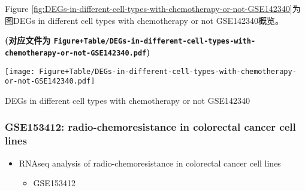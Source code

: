 \documentclass[
]{article}
\providecommand{\tightlist}{%
  \setlength{\itemsep}{0pt}\setlength{\parskip}{0pt}}
\begin{document}
Figure \ref{fig:DEGs-in-different-cell-types-with-chemotherapy-or-not-GSE142340}为图DEGs in different cell types with chemotherapy or not GSE142340概览。

\textbf{(对应文件为 \texttt{Figure+Table/DEGs-in-different-cell-types-with-chemotherapy-or-not-GSE142340.pdf})}

\def\@captype{figure}
\begin{center}
\texttt{[image: Figure+Table/DEGs-in-different-cell-types-with-chemotherapy-or-not-GSE142340.pdf]}
\caption{DEGs in different cell types with chemotherapy or not GSE142340}\label{fig:DEGs-in-different-cell-types-with-chemotherapy-or-not-GSE142340}
\end{center}

\hypertarget{gse153412-radio-chemoresistance-in-colorectal-cancer-cell-lines}{%
\subsubsection{GSE153412: radio-chemoresistance in colorectal cancer cell lines}\label{gse153412-radio-chemoresistance-in-colorectal-cancer-cell-lines}}

\begin{itemize}
\tightlist
\item
  RNAseq analysis of radio-chemoresistance in colorectal cancer cell lines

  \begin{itemize}
  \tightlist
  \item
    GSE153412
  \end{itemize}
\end{itemize}
\end{document}
